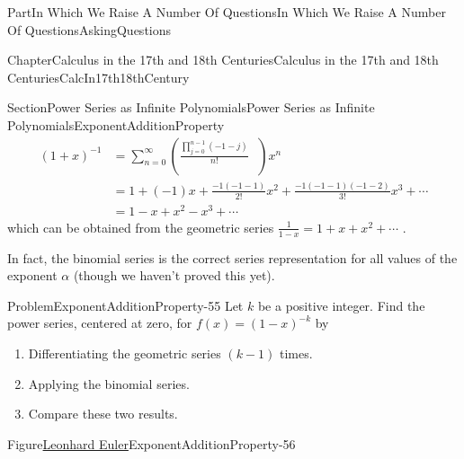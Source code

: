\documentclass[oneside,10pt,]{book}
\numberwithin{equation}{part}
\newcommand{\amp}{&}
\begin{document}
\begin{partptx}{Part}{In Which We Raise A Number Of Questions}{}{In Which We Raise A Number Of Questions}{}{}{AskingQuestions}
\begin{chapterptx}{Chapter}{Calculus in the 17th and 18th Centuries}{}{Calculus in the 17th and 18th Centuries}{}{}{CalcIn17th18thCentury}
\begin{sectionptx}{Section}{Power Series as Infinite Polynomials}{}{Power Series as Infinite Polynomials}{}{}{ExponentAdditionProperty}
\begin{align*}
\left(1+x\right)^{-1}\amp =\sum_{n=0}^\infty\left(\frac{\prod_{j=0}^{n-1}\left(-1-j\right)}{n!}\text{ } \right)x^n\\
\amp =1+(-1)x+\frac{-1\left(-1-1\right)}{2!}x^2+\frac{-1\left(-1-1\right)\left(-1-2\right)}{3!}x^3+\cdots\\
\amp =1-x+x^2-x^3+\cdots
\end{align*}
which can be obtained from the geometric series \(\frac{1}{1-x}=1+x+x^2+\cdots\) .%
\par
In fact, the binomial series is the correct series representation for all values of the exponent \(\alpha\) (though we haven't proved this yet).%
\begin{problem}{Problem}{}{ExponentAdditionProperty-55}%
Let \(k\) be a positive integer.  Find the power series, centered at zero, for \(f(x) =
\left(1-x\right)^{-k}\) by%
\begin{enumerate}[font=\bfseries,label=(\alph*),ref=\alph*]%
\item{}Differentiating the  geometric series \(\left(k-1\right)\) times.%
\item{}Applying the binomial series.%
\item{}Compare these two results.%
\end{enumerate}%
\end{problem}
\begin{figureptx}{Figure}{\href{https://mathshistory.st-andrews.ac.uk/Biographies/Euler/}{Leonhard Euler}\protect\footnotemark{}}{ExponentAdditionProperty-56}{}%
%
\begin{image}{0.325}{0.35}{0.325}{}%

\end{image}
\end{figureptx}
\end{sectionptx}
\end{chapterptx}
\end{partptx}
\end{document}

